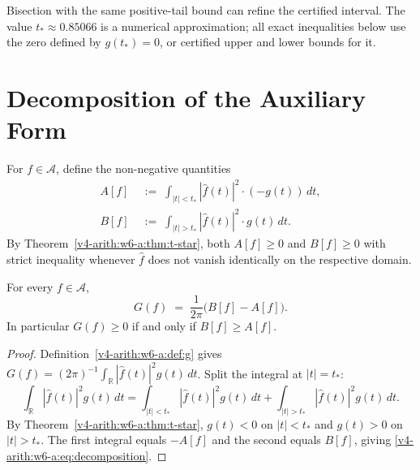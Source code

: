 \begin{remark}
\label{v4-arith:w6-a:rem:t-star-refinement}
Bisection with the same positive-tail bound can refine the
certified interval. The value \(t_*\approx0.85066\) is a numerical
approximation; all exact inequalities below use the zero defined
by \(g(t_*)=0\), or certified upper and lower bounds for it.
\end{remark}

\section{Decomposition of the Auxiliary Form}
\label{v4-arith:w6-a:decomposition}

\begin{definition}
\label{v4-arith:w6-a:def:core-tail}
For \(f\in\mathscr A\), define
the non-negative quantities
\begin{align}
\label{v4-arith:w6-a:eq:A-core}
A[f]&\;:=\;\int_{|t|<t_{\ast}}|\widehat{f}(t)|^{2}\cdot(-g(t))\,dt,\\
\label{v4-arith:w6-a:eq:B-tail}
B[f]&\;:=\;\int_{|t|>t_{\ast}}|\widehat{f}(t)|^{2}\cdot g(t)\,dt.
\end{align}
By Theorem~\ref{v4-arith:w6-a:thm:t-star}, both \(A[f]\geq 0\) and \(B[f]\geq 0\)
with strict inequality whenever \(\widehat{f}\) does not vanish
identically on the respective domain.
\end{definition}

\begin{lemma}
\label{v4-arith:w6-a:lem:decomposition}
For every \(f\in\mathscr A\),
\begin{equation}
\label{v4-arith:w6-a:eq:decomposition}
G(f)\;=\;\frac{1}{2\pi}\bigl(B[f]-A[f]\bigr).
\end{equation}
In particular \(G(f)\geq 0\) if and only if
\(B[f]\geq A[f]\).
\end{lemma}

\begin{proof}
Definition~\ref{v4-arith:w6-a:def:g} gives
\(G(f)=(2\pi)^{-1}\int_{\mathbb{R}}|\widehat{f}(t)|^{2}g(t)\,dt\).
Split the integral at \(|t|=t_{\ast}\):
\[
\int_{\mathbb{R}}|\widehat{f}(t)|^{2}g(t)\,dt
=\int_{|t|<t_{\ast}}|\widehat{f}(t)|^{2}g(t)\,dt+\int_{|t|>t_{\ast}}|\widehat{f}(t)|^{2}g(t)\,dt.
\]
By Theorem~\ref{v4-arith:w6-a:thm:t-star}, \(g(t)<0\) on \(|t|<t_{\ast}\) and
\(g(t)>0\) on \(|t|>t_{\ast}\). The first integral equals \(-A[f]\) and the
second equals \(B[f]\), giving
\eqref{v4-arith:w6-a:eq:decomposition}.
\end{proof}

